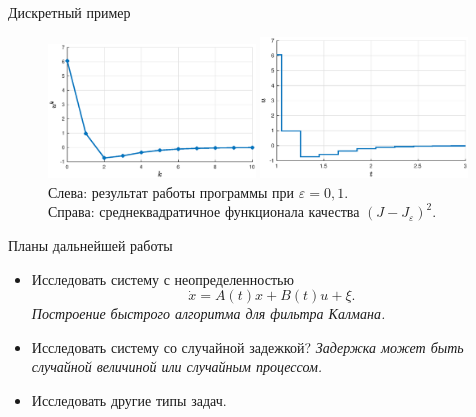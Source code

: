         \begin{frame}{Дискретный пример}
                \begin{figure}[t]
                        \hfill
                        \includegraphics[width=0.49\textwidth]{content/discrete-example/discr_control.eps}
                        \hfill
                        \includegraphics[width=0.49\textwidth]{content/discrete-example/control.eps}
                        \hfill
                        Слева: результат работы программы при $\varepsilon = 0,\!1$.\\
                        Справа: среднеквадратичное функционала качества $(J - J_{\varepsilon})^2$.
                \end{figure}
        \end{frame}
        \begin{frame}{Планы дальнейшей работы}
                \begin{itemize}
                        \item
Исследовать систему с неопределенностью
$$
        \dot x = A(t) x + B(t) u + \xi.
$$
\textit{Построение быстрого алгоритма для фильтра Калмана.}
                        \item
Исследовать систему со случайной задежкой?
\textit{Задержка может быть случайной величиной или случайным процессом.}
                        \item
Исследовать другие типы задач.
                \end{itemize}
                \end{frame}